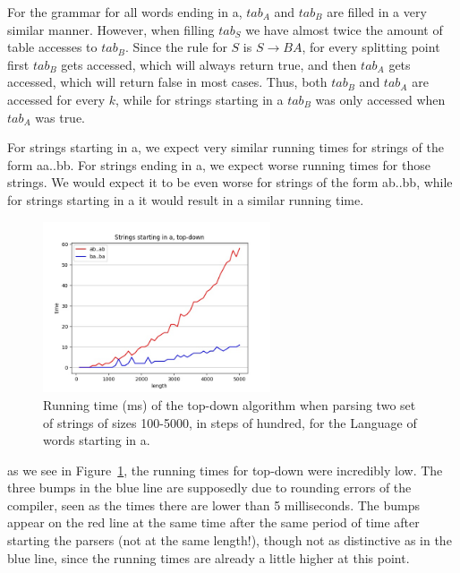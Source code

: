 For the grammar for all words ending in a, $tab_A$ and $tab_B$ are filled in a very similar manner.
However, when filling $tab_S$ we have almost twice the amount of table accesses to $tab_B$.
Since the rule for $S$ is $S\rightarrow BA$, for every splitting point first $tab_B$ gets accessed, which will always return true, and then $tab_A$ gets accessed, which will return false in most cases.
Thus, both $tab_B$ and $tab_A$ are accessed for every $k$, while for strings starting in a $tab_B$ was only accessed when $tab_A$ was true.

For strings starting in a, we expect very similar running times for strings of the form aa..bb.
For strings ending in a, we expect worse running times for those strings.
We would expect it to be even worse for strings of the form ab..bb, while for strings starting in a it would result in a similar running time.


\begin{figure}[h!]
    \centering
    \includegraphics[width=0.6\textwidth]{Images/t_sa_td.jpg}
    \caption{Running time (ms) of the top-down algorithm when parsing two set of strings of sizes 100-5000, in steps of hundred, for the Language of words starting in a.}
    \label{fig:t_sa_td}
\end{figure}

as we see in Figure~\ref{fig:t_sa_td}, the running times for top-down were incredibly low.
The three bumps in the blue line are supposedly due to rounding errors of the compiler, seen as the times there are lower than 5 milliseconds.
The bumps appear on the red line at the same time after the same period of time after starting the parsers (not at the same length!), though not as distinctive as in the blue line, since the running times are already a little higher at this point.

